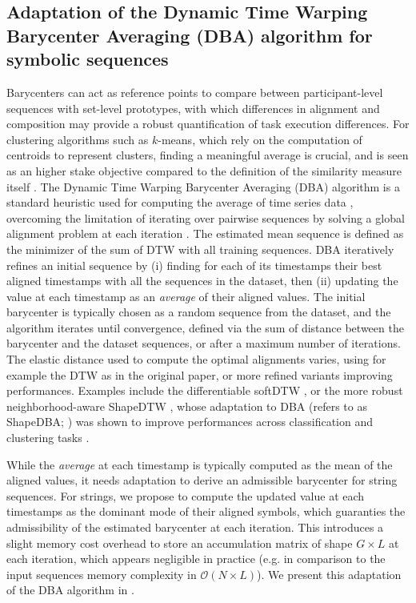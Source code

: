 \begin{chapterabstract}
    \subsection{Adaptation of the Dynamic Time Warping Barycenter Averaging (DBA) algorithm for symbolic sequences}
    \label{sec:chapter_6_adaptation_DBA}

    Barycenters can act as reference points to compare between participant-level sequences with set-level prototypes, with which differences in alignment and composition may provide a robust quantification of task execution differences. For clustering algorithms such as $k$-means, which rely on the computation of centroids to represent clusters, finding a meaningful average is crucial, and is seen as an higher stake objective compared to the definition of the similarity measure itself \cite{fawaz2023shapedba}. The Dynamic Time Warping Barycenter Averaging (DBA) algorithm is a standard heuristic used for computing the average of time series data \cite{10.1109ICDM.2014.27}, overcoming the limitation of iterating over pairwise sequences by solving a global alignment problem at each iteration \cite{PETITJEAN2011678}. The estimated mean sequence is defined as the minimizer of the sum of DTW with all training sequences. DBA iteratively refines an initial sequence by (i) finding for each of its timestamps their best aligned timestamps with all the sequences in the dataset, then (ii) updating the value at each timestamp as an \emph{average} of their aligned values. The initial barycenter is typically chosen as a random sequence from the dataset, and the algorithm iterates until convergence, defined via the sum of distance between the barycenter and the dataset sequences, or after a maximum number of iterations. The elastic distance used to compute the optimal alignments varies, using for example the DTW as in the original paper, or more refined variants improving performances. Examples include the differentiable softDTW \cite{10.5555/3305381.3305474}, or the more robust neighborhood-aware ShapeDTW \cite{zhao2018shapedtw}, whose adaptation to DBA (refers to as ShapeDBA;  \cite{fawaz2023shapedba}) was shown to improve performances across classification and clustering tasks \cite{fawaz2023shapedba}. 

    While the \emph{average} at each timestamp is typically computed as the mean of the aligned values, it needs adaptation to derive an admissible barycenter for string sequences. For strings, we propose to compute the updated value at each timestamps as the dominant mode of their aligned symbols, which guaranties the admissibility of the estimated barycenter at each iteration. This introduces a slight memory cost overhead to store an accumulation matrix of shape $G\times L$ at each iteration, which appears negligible in practice (e.g. in comparison to the input sequences memory complexity in $\mathcal{O}(N \times L)$). We present this adaptation of the DBA algorithm in .


\end{chapterabstract}
